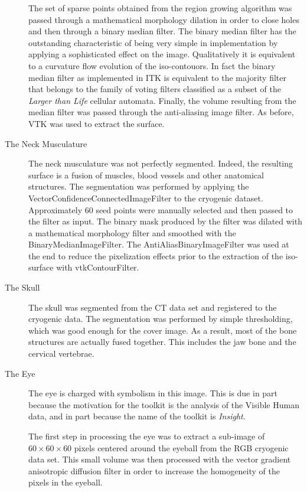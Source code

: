 \begin{description}
The set of sparse points obtained from the region growing algorithm was
passed through a mathematical morphology dilation in order to close holes and
then through a binary median filter. The binary median filter has the
outstanding characteristic of being very simple in implementation by applying
a sophisticated effect on the image. Qualitatively it is equivalent to a
curvature flow evolution of the iso-contouors. In fact the binary median
filter as implemented in ITK is equivalent to the majority filter that
belongs to the family of voting filters classified as a subset of the
\emph{Larger than Life} cellular automata. Finally, the volume resulting from
the median filter was passed through the anti-aliasing image filter. As
before, VTK was used to extract the surface.

\item[The Neck Musculature]
The neck musculature was not perfectly segmented. Indeed, the resulting
surface is a fusion of muscles, blood vessels and other anatomical
structures. The segmentation was performed by applying the
VectorConfidenceConnectedImageFilter to the cryogenic dataset. Approximately
60 seed points were manually selected and then passed to the filter as
input. The binary mask produced by the filter was dilated with a mathematical
morphology filter and smoothed with the BinaryMedianImageFilter. The
AntiAliasBinaryImageFilter was used at the end to reduce the pixelization
effects prior to the extraction of the iso-surface with vtkContourFilter.

\item[The Skull]
The skull was segmented from the CT data set and registered to the cryogenic
data. The segmentation was performed by simple thresholding, which was good
enough for the cover image. As a result, most of the bone structures are
actually fused together. This includes the jaw bone and the cervical
vertebrae.

\item[The Eye] 
The eye is charged with symbolism in this image. This is due in part because
the motivation for the toolkit is the analysis of the Visible Human data,
and in part because the name of the toolkit is \emph{Insight}.

The first step in processing the eye was to extract a sub-image of
$60\times60\times60$ pixels centered around the eyeball from the RGB
cryogenic data set. This small volume was then processed with the vector
gradient anisotropic diffusion filter in order to increase the homogeneity of
the pixels in the eyeball.


\end{description}
